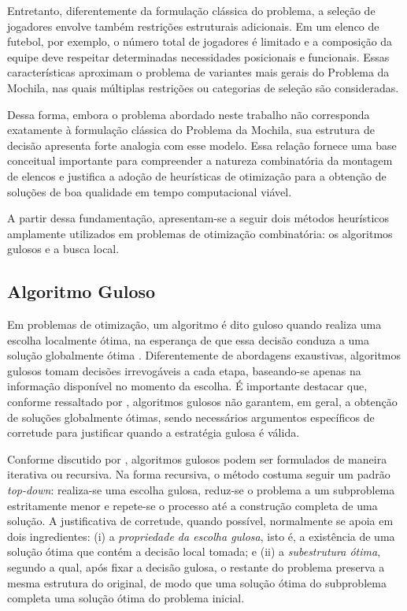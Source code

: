 Entretanto, diferentemente da formulação clássica do problema, a seleção de jogadores envolve também restrições estruturais adicionais. Em um elenco 
de futebol, por exemplo, o número total de jogadores é limitado e a composição da equipe deve respeitar determinadas necessidades posicionais e funcionais. 
Essas características aproximam o problema de variantes mais gerais do Problema da Mochila, nas quais múltiplas restrições ou categorias de seleção são consideradas.

Dessa forma, embora o problema abordado neste trabalho não corresponda exatamente à formulação clássica do Problema da Mochila, sua estrutura 
de decisão apresenta forte analogia com esse modelo. Essa relação fornece uma base conceitual importante para compreender a natureza combinatória da montagem de 
elencos e justifica a adoção de heurísticas de otimização para a obtenção de soluções de boa qualidade em tempo computacional viável.

A partir dessa fundamentação, apresentam-se a seguir dois métodos heurísticos amplamente utilizados em problemas de otimização combinatória: 
os algoritmos gulosos e a busca local.

\subsection{Algoritmo Guloso}

Em problemas de otimização, um algoritmo é dito guloso quando realiza uma escolha localmente ótima, na esperança de que essa decisão conduza a 
uma solução globalmente ótima \cite{Cormen2009}. Diferentemente de abordagens exaustivas, algoritmos gulosos tomam decisões irrevogáveis a cada etapa, baseando-se
apenas na informação disponível no momento da escolha. É importante destacar que, conforme ressaltado por \cite{Cormen2009}, 
algoritmos gulosos não garantem, em geral, a obtenção de soluções globalmente ótimas, sendo necessários argumentos específicos de corretude para justificar
quando a estratégia gulosa é válida.

Conforme discutido por \cite{Cormen2009}, algoritmos gulosos podem ser formulados de maneira iterativa ou recursiva. Na forma recursiva, o método costuma
seguir um padrão \textit{top-down}: realiza-se uma escolha gulosa, reduz-se o problema a um subproblema estritamente menor e repete-se o processo até a
construção completa de uma solução. A justificativa de corretude, quando possível, normalmente se apoia em dois ingredientes: (i) a \textit{propriedade da
escolha gulosa}, isto é, a existência de uma solução ótima que contém a decisão local tomada; e (ii) a \textit{subestrutura ótima}, segundo a qual, após
fixar a decisão gulosa, o restante do problema preserva a mesma estrutura do original, de modo que uma solução ótima do subproblema completa uma solução
ótima do problema inicial.

